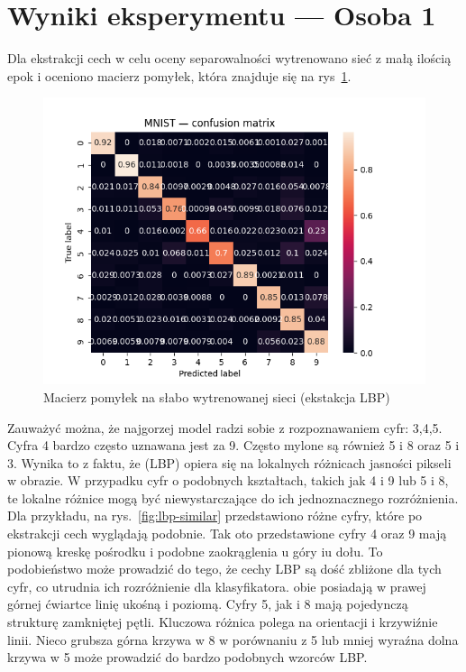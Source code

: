 \documentclass[10pt]{article}
\begin{document}
\pagebreak

\section{Wyniki eksperymentu --- Osoba 1}
Dla ekstrakcji cech w celu oceny separowalności wytrenowano sieć z małą ilością epok i oceniono macierz pomyłek, która znajduje się na rys~\ref{fig:lbp-bad-cm}.

\begin{figure}[H]\centering
    \includegraphics[width=.3\linewidth]{img/LBP/LBP_MLP}
    \caption{Macierz pomyłek na słabo wytrenowanej sieci (ekstakcja LBP)}\label{fig:lbp-bad-cm}
\end{figure}

Zauważyć można, że najgorzej model radzi sobie z rozpoznawaniem cyfr: 3,4,5.
Cyfra 4 bardzo często uznawana jest za 9.
Często mylone są również 5 i 8 oraz 5 i 3.
Wynika to z faktu, że (LBP) opiera się na lokalnych różnicach jasności pikseli w obrazie. W przypadku cyfr o podobnych kształtach, takich jak 4 i 9 lub 5 i 8, te lokalne różnice mogą być niewystarczające do ich jednoznacznego rozróżnienia.
Dla przykładu, na rys.~\ref{fig:lbp-similar} przedstawiono różne cyfry, które po
ekstrakcji cech wyglądają podobnie.
Tak oto przedstawione cyfry 4 oraz 9 mają pionową kreskę pośrodku i podobne zaokrąglenia u góry iu dołu.
To podobieństwo może prowadzić do tego, że cechy LBP są dość zbliżone dla tych cyfr, co utrudnia ich rozróżnienie dla klasyfikatora.
obie posiadają w prawej górnej ćwiartce linię ukośną i poziomą.
Cyfry 5, jak i 8 mają pojedynczą strukturę zamkniętej pętli. Kluczowa różnica polega na orientacji i krzywiźnie linii.
Nieco grubsza górna krzywa w 8 w porównaniu z 5 lub mniej wyraźna dolna krzywa w 5 może prowadzić do bardzo podobnych wzorców LBP.
\end{document}
